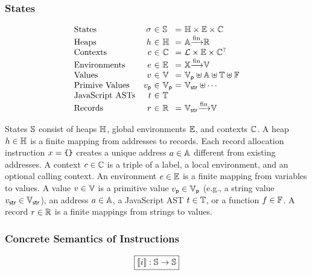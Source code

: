 \subsubsection{States}

\[
  \begin{array}{lr@{~}c@{~}l@{~}c@{~}l}
    \text{States} & \st &\in& \stset &=&
    \heapset \times \envset \times \ctxtset\\
    \text{Heaps} & \heap &\in& \heapset &=&
    \addrset \finmap \recset\\
    \text{Contexts} & \ctxt &\in& \ctxtset &=&
    \labset \times \envset \times \ctxtset^?\\
    \text{Environments} & \env &\in& \envset &=&
    \varset \finmap \valset\\
    \text{Values} & \val &\in& \valset &=&
    \pvalset \uplus \addrset \uplus \treeset \uplus \funcset\\
    \text{Primive Values} & \pval &\in& \pvalset &=&
    \strset \uplus \cdots\\
    \text{JavaScript ASTs} & \tree &\in& \treeset\\
    \text{Records} & \rec &\in& \recset &=&
    \strset \finmap \valset\\
  \end{array}
\]

States $\mathbb{S}$ consist of heaps $\mathbb{H}$, global environments $\mathbb{E}$, and
contexts $\mathbb{C}$.  A heap $h \in \mathbb{H}$ is a finite mapping from
addresses to records.  Each record allocation instruction $x = \texttt{\{} \texttt{\}}$
creates a unique address $a \in \mathbb{A}$ different from existing addresses.
A context $c \in \mathbb{C}$ is a triple of a label, a local environment, and
an optional calling context.  An environment $e \in \mathbb{E}$ is a finite
mapping from variables to values. A value $v \in \mathbb{V}$ is a primitive
value $v_{\textsf{p}} \in \mathbb{V}_{\textsf{p}}$ (e.g., a string value $v_{\textsf{str}} \in \mathbb{V}_{\textsf{str}}$), an address
$a \in \mathbb{A}$, a JavaScript AST $t \in \mathbb{T}$, or a function $f
\in \mathbb{F}$.  A record $r \in \mathbb{R}$ is a finite mappings from strings to
values.

\subsubsection{Concrete Semantics of Instructions}

\[
  \framebox{$\sem{\inst}: \stset \rightarrow \stset$}
\]

\todo

